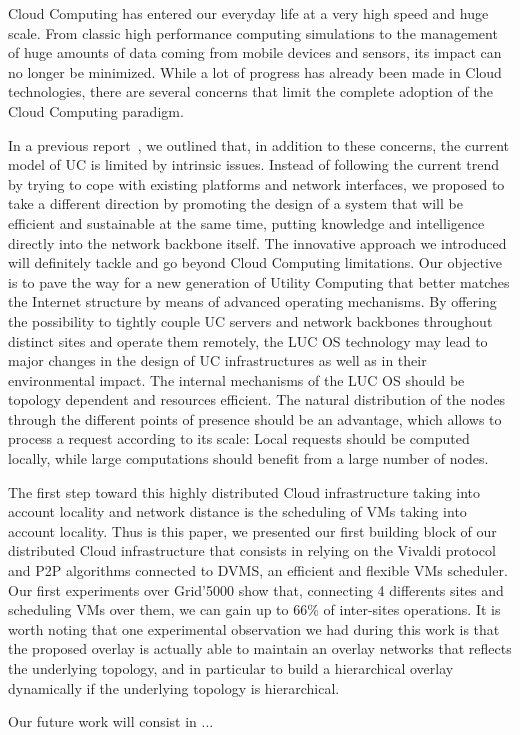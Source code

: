 
Cloud Computing has entered our everyday life at a very high speed and huge scale. From classic high performance computing simulations to the management of huge amounts of data coming from mobile devices and sensors, its impact can no longer be minimized. While a lot of progress has already been made in Cloud technologies, there are several concerns that limit the complete adoption of the Cloud Computing paradigm.

In a previous report~\cite{lebre:hal-00854204}, we outlined that, in addition to these concerns, the current model of UC is limited by intrinsic issues. Instead of following the current trend by trying to cope with existing platforms and network interfaces, we proposed to take a different direction by promoting the design of a system that will be efficient and sustainable at the same time, putting knowledge and intelligence directly into the network backbone itself. The innovative approach we introduced will definitely tackle and go beyond Cloud Computing limitations. Our objective is to pave the way for a new generation of Utility Computing that better matches the Internet structure by means of advanced operating mechanisms. By offering the possibility to tightly couple UC servers and network backbones throughout distinct sites and operate them remotely, the LUC OS technology may lead to major changes in the design of UC infrastructures as well as in their environmental impact. The internal mechanisms of the LUC OS should be topology dependent and resources efficient. The natural distribution of the nodes through the different points of presence should be an advantage, which allows to process a request according to its scale: Local requests should be computed locally, while large computations should benefit from a large number of nodes.

The first step toward this highly distributed Cloud infrastructure taking into account locality and network distance is the scheduling of VMs taking into account locality. Thus is this paper, we presented our first building block of our distributed Cloud infrastructure that consists in relying on the Vivaldi protocol and P2P algorithms connected to DVMS, an efficient and flexible VMs scheduler. Our first experiments over Grid'5000 show that, connecting 4 differents sites and scheduling VMs over them, we can gain up to 66\% of inter-sites operations. It is worth noting that one experimental observation we had during this work is that the proposed overlay is actually able to maintain an overlay networks that reflects the underlying topology, and in particular to build a hierarchical overlay dynamically if the underlying topology is hierarchical.

Our future work will consist in ... 
